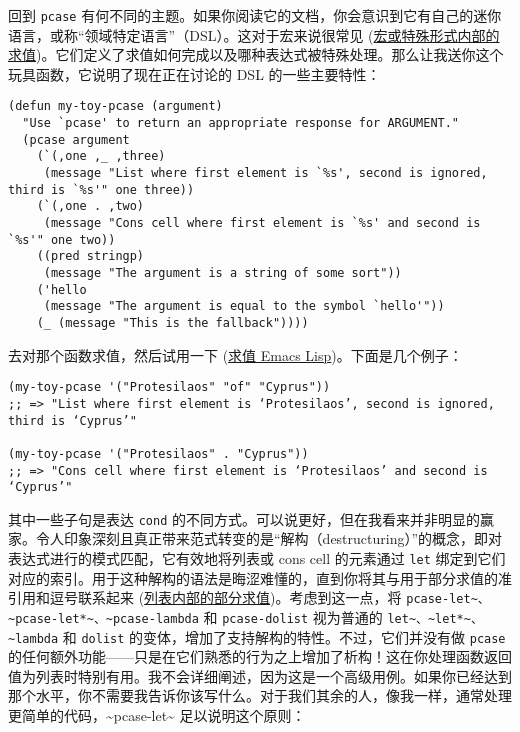 \documentclass[11pt]{ctexart}
\begin{document}
回到 \texttt{pcase} 有何不同的主题。如果你阅读它的文档，你会意识到它有自己的迷你语言，或称“领域特定语言”（DSL）。这对于宏来说很常见 (\hyperref[sec:org6bfc8f0]{宏或特殊形式内部的求值})。它们定义了求值如何完成以及哪种表达式被特殊处理。那么让我送你这个玩具函数，它说明了现在正在讨论的 DSL 的一些主要特性：

\begin{verbatim}
(defun my-toy-pcase (argument)
  "Use `pcase' to return an appropriate response for ARGUMENT."
  (pcase argument
    (`(,one ,_ ,three)
     (message "List where first element is `%s', second is ignored, third is `%s'" one three))
    (`(,one . ,two)
     (message "Cons cell where first element is `%s' and second is `%s'" one two))
    ((pred stringp)
     (message "The argument is a string of some sort"))
    ('hello
     (message "The argument is equal to the symbol `hello'"))
    (_ (message "This is the fallback"))))
\end{verbatim}

去对那个函数求值，然后试用一下 (\hyperref[sec:org5e72a31]{求值 Emacs Lisp})。下面是几个例子：

\begin{verbatim}
(my-toy-pcase '("Protesilaos" "of" "Cyprus"))
;; => "List where first element is ‘Protesilaos’, second is ignored, third is ‘Cyprus’"

(my-toy-pcase '("Protesilaos" . "Cyprus"))
;; => "Cons cell where first element is ‘Protesilaos’ and second is ‘Cyprus’"
\end{verbatim}

其中一些子句是表达 \texttt{cond} 的不同方式。可以说更好，但在我看来并非明显的赢家。令人印象深刻且真正带来范式转变的是“解构（destructuring）”的概念，即对表达式进行的模式匹配，它有效地将列表或 cons cell 的元素通过 \texttt{let} 绑定到它们对应的索引。用于这种解构的语法是晦涩难懂的，直到你将其与用于部分求值的准引用和逗号联系起来 (\hyperref[sec:org7fa9c71]{列表内部的部分求值})。考虑到这一点，将 \texttt{pcase-let\textasciitilde{}、\textasciitilde{}pcase-let*\textasciitilde{}、\textasciitilde{}pcase-lambda} 和 \texttt{pcase-dolist} 视为普通的 \texttt{let\textasciitilde{}、\textasciitilde{}let*\textasciitilde{}、\textasciitilde{}lambda} 和 \texttt{dolist} 的变体，增加了支持解构的特性。不过，它们并没有做 \texttt{pcase} 的任何额外功能——只是在它们熟悉的行为之上增加了析构！这在你处理函数返回值为列表时特别有用。我不会详细阐述，因为这是一个高级用例。如果你已经达到那个水平，你不需要我告诉你该写什么。对于我们其余的人，像我一样，通常处理更简单的代码，\textasciitilde{}pcase-let\textasciitilde{} 足以说明这个原则：
\end{document}
